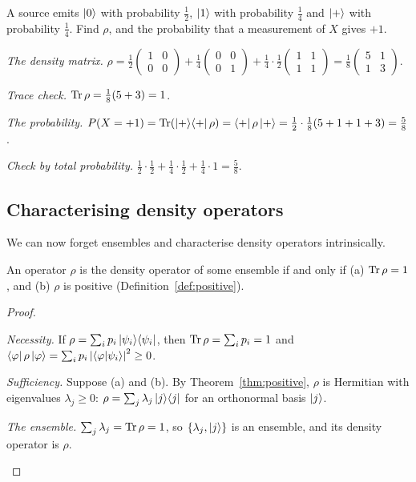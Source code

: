 \begin{example}\label{ex:three-ensemble}
  A source emits $\left|0\right\rangle$ with probability $\tfrac12$, $\left|1\right\rangle$ with probability $\tfrac14$ and $\left|+\right\rangle$ with probability $\tfrac14$. Find $\rho$, and the probability that a measurement of $X$ gives $+1$.
\end{example}
\begin{solution}
  \begin{steps}
    \item \emph{The density matrix.} $\rho=\tfrac12\begin{pmatrix}1&0\\0&0\end{pmatrix}+\tfrac14\begin{pmatrix}0&0\\0&1\end{pmatrix}+\tfrac14\cdot\tfrac12\begin{pmatrix}1&1\\1&1\end{pmatrix}=\tfrac18\begin{pmatrix}5&1\\1&3\end{pmatrix}$.
    \item \emph{Trace check.} $\operatorname{Tr}\rho=\tfrac18(5+3)=1$.
    \item \emph{The probability.} $P(X=+1)=\operatorname{Tr}(\left|+\right\rangle\!\left\langle+\right|\rho)=\left\langle+\right|\rho\left|+\right\rangle=\tfrac12\cdot\tfrac18(5+1+1+3)=\tfrac58$.
    \item \emph{Check by total probability.} $\tfrac12\cdot\tfrac12+\tfrac14\cdot\tfrac12+\tfrac14\cdot1=\tfrac58$.
  \end{steps}
\end{solution}

\subsection{Characterising density operators}

We can now forget ensembles and characterise density operators intrinsically.

\begin{theorem}[Characterisation]\label{thm:density-char}
  An operator $\rho$ is the density operator of some ensemble if and only if (a) $\operatorname{Tr}\rho=1$, and (b) $\rho$ is positive (Definition~\ref{def:positive}).
\end{theorem}
\begin{proof}
  \begin{steps}
    \item \emph{Necessity.} If $\rho=\sum_ip_i\left|\psi_i\right\rangle\!\left\langle\psi_i\right|$, then $\operatorname{Tr}\rho=\sum_ip_i=1$ and $\left\langle\varphi\right|\rho\left|\varphi\right\rangle=\sum_ip_i\left|\left\langle\varphi\middle|\psi_i\right\rangle\right|^2\ge0$.
    \item \emph{Sufficiency.} Suppose (a) and (b). By Theorem~\ref{thm:positive}, $\rho$ is Hermitian with eigenvalues $\lambda_j\ge0$: $\rho=\sum_j\lambda_j\left|j\right\rangle\!\left\langle j\right|$ for an orthonormal basis $\left|j\right\rangle$.
    \item \emph{The ensemble.} $\sum_j\lambda_j=\operatorname{Tr}\rho=1$, so $\{\lambda_j,\left|j\right\rangle\}$ is an ensemble, and its density operator is $\rho$. \qedhere
  \end{steps}
\end{proof}

